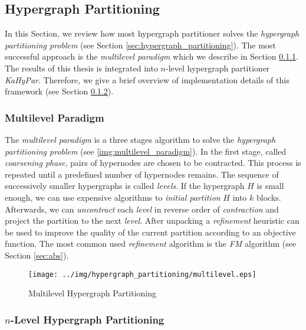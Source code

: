 
\subsection{Hypergraph Partitioning}

In this Section, we review how most hypergraph partitioner solves the \emph{hypergraph
partitioning problem} (see Section \ref{sec:hypergraph_partitioning}). The most successful
approach is the \emph{multilevel paradigm} \cite{alpert1995recent,bader2013graph,
papa2007hypergraph} which we describe in Section \ref{sec:multilevel_paradigm}.
The results of this thesis is integrated into $n$-level hypergraph partitioner \emph{KaHyPar}. Therefore, we
give a brief overview of implementation details of this framework (see Section \ref{sec:kahypar}).

\subsubsection{Multilevel Paradigm}
\label{sec:multilevel_paradigm}

The \emph{multilevel paradigm} is a three stages algorithm to solve the \emph{hypergraph 
partitioning problem} (see \autoref{img:multilevel_paradigm}). In the first stage, called
\emph{coarsening phase}, pairs of hypernodes are chosen to be contracted. This process is
repeated until a predefined number of hypernodes remains. The sequence of successively
smaller hypergraphs is called \emph{levels}. If the hypergraph $H$ is small enough, we can use
expensive algorithms to \emph{initial partition} $H$ into $k$ blocks. Afterwards, we can
\emph{uncontract} each \emph{level} in reverse order of \emph{contraction} and project
the partition to the next \emph{level}. After unpacking a \emph{refinement} heuristic can be
used to improve the quality of the current partition according
to an objective function. The most common used \emph{refinement} algorithm is the \emph{FM}
algorithm \cite{fiduccia1988linear} (see Section \ref{sec:abs}).

\begin{figure}
\centering
\texttt{[image: ../img/hypergraph\_partitioning/multilevel.eps]}
\caption{Multilevel Hypergraph Partitioning}
\label{img:multilevel_paradigm}
\end{figure}


\subsubsection{$n$-Level Hypergraph Partitioning}
\label{sec:kahypar}

